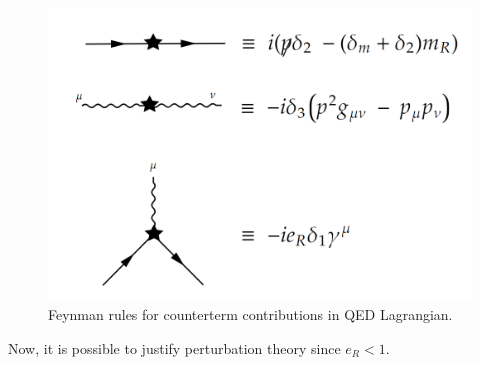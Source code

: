 \documentclass[11pt]{article}
\begin{document}
\begin{figure}[H]
	\centering
	\includegraphics[width=0.65\linewidth]{img/5.png}
	\caption{Feynman rules for counterterm contributions in QED Lagrangian.}
	\label{ctfeynrul}
\end{figure}
Now, it is possible to justify perturbation theory since $e_R<1$.
\end{document}
